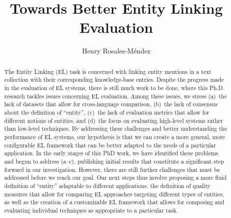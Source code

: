 \documentclass[sigconf]{acmart}
\begin{document}
%
\title{Towards Better Entity Linking Evaluation}

%
\author{Henry Rosales-M\'endez}




%
\renewcommand{\shortauthors}{Rosales-M\'endez et al.}

%
\begin{abstract}
The Entity Linking (EL) task is concerned with linking entity mentions in a text collection with their corresponding knowledge-base entries. Despite the progress made in the evaluation of EL systems, there is still much work to be done, where this Ph.D. research tackles issues concerning EL evaluation. Among these issues, we stress (a)~the lack of datasets that allow for cross-language comparison, (b)~the lack of consensus about the definition of ``entity'', (c)~the lack of evaluation metrics that allow for different notions of entities, and (d)~the focus on evaluating high-level systems rather than low-level techniques. By addressing these challenges and better understanding the performance of EL systems, our hypothesis is that we can create a more general, more configurable EL framework that can be better adapted to the needs of a particular application. In the early stages of this PhD work, we have identified these problems and begun to address (a--c), publishing initial results that constitute a significant step forward in our investigation. However, there are still further challenges that must be addressed before we reach our goal. Our next steps thus involve proposing a more fluid definition of ``entity'' adaptable to different applications, the definition of quality measures that allow for comparing EL approaches targeting different types of entities, as well as the creation of a customizable EL framework that allows for composing and evaluating individual techniques as appropriate to a particular task.
\end{abstract}
\end{document}
